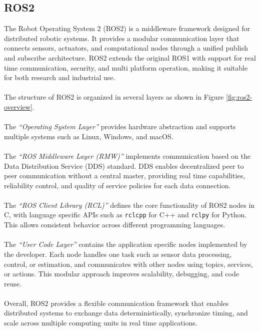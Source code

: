 \subsection{ROS2}
The Robot Operating System 2 (ROS2) is a middleware framework designed for distributed robotic systems. It provides a modular communication layer that connects sensors, actuators, and computational nodes through a unified publish and subscribe architecture. ROS2 extends the original ROS1 with support for real time communication, security, and multi platform operation, making it suitable for both research and industrial use.  
\\ \\
The structure of ROS2 is organized in several layers as shown in Figure \ref{fig:ros2-overview}.  
\\ \\
The \textit{``Operating System Layer''} provides hardware abstraction and supports multiple systems such as Linux, Windows, and macOS.  
\\ \\
The \textit{``ROS Middleware Layer (RMW)''} implements communication based on the Data Distribution Service (DDS) standard. DDS enables decentralized peer to peer communication without a central master, providing real time capabilities, reliability control, and quality of service policies for each data connection.  
\\ \\
The \textit{``ROS Client Library (RCL)''} defines the core functionality of ROS2 nodes in C, with language specific APIs such as \texttt{rclcpp} for C++ and \texttt{rclpy} for Python. This allows consistent behavior across different programming languages.  
\\ \\
The \textit{``User Code Layer''} contains the application specific nodes implemented by the developer. Each node handles one task such as sensor data processing, control, or estimation, and communicates with other nodes using topics, services, or actions. This modular approach improves scalability, debugging, and code reuse.  
\\ \\
Overall, ROS2 provides a flexible communication framework that enables distributed systems to exchange data deterministically, synchronize timing, and scale across multiple computing units in real time applications.
